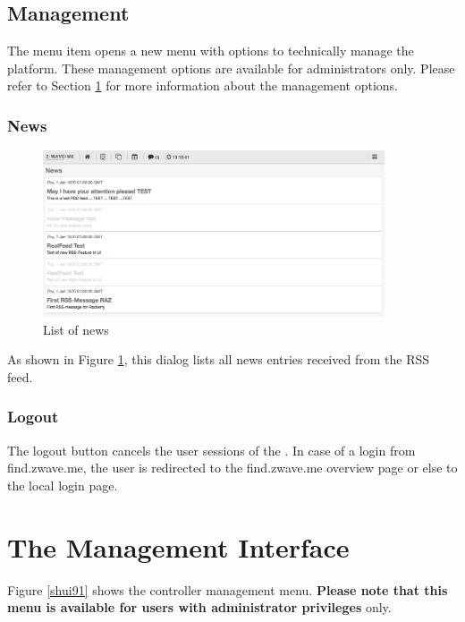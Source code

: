 \subsection{Management}

The menu item  opens a new menu with options to technically manage the platform. 
These management options are available for administrators only. Please refer to Section 
\ref{ManagementInterface} for more information about the management options.

\subsubsection{News}
\label{news}

\begin{figure}
\begin{center}
\includegraphics[width=0.9\textwidth]{pngs/cap4/news2.png}
\caption{List of \zway news}
\label{news2}
\end{center}
\end{figure}

As shown in Figure \ref{news2}, this dialog lists all news entries received from the RSS feed.

\subsubsection{Logout}

The logout button cancels the user sessions of the \zwshui. In case of 
a login from find.zwave.me, the user is redirected to the find.zwave.me overview page or 
else to the local login page.

\section {The Management Interface}
\label{ManagementInterface}

Figure \ref{shui91} shows the controller management menu. \textbf{Please note that this 
menu is available for users with administrator privileges} only.

